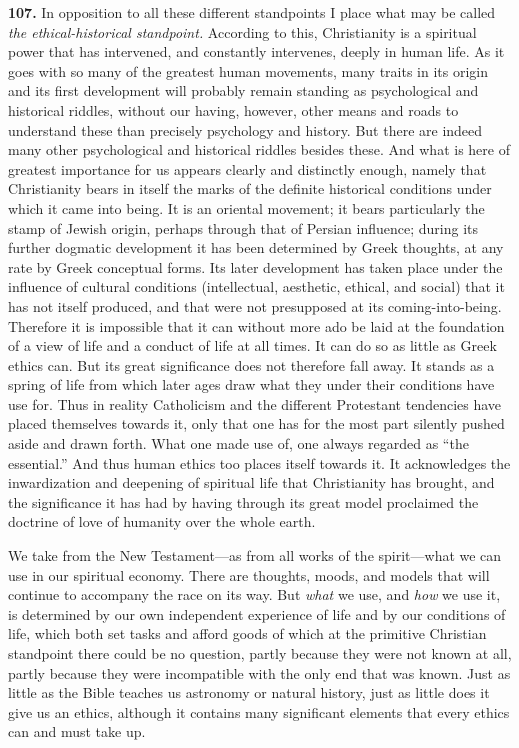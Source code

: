 \documentclass[12pt,a4paper]{book}
\newcommand{\opage}[1]{\marginnote{\footnotesize\textit{[#1]}}}
\begin{document}
\noindent\textbf{107.} In opposition to all these different standpoints I place what may be called \emph{the
ethical-historical standpoint.} According 
\opage{236}to this, Christianity is a spiritual power that has intervened, and constantly
intervenes, deeply in human life. As it goes with so many of the greatest human movements, many traits in its origin and
its first development will probably remain standing as psychological and historical riddles, without our having,
however, other means and roads to understand these than precisely psychology and history. But there are indeed many
other psychological and historical riddles besides these. And what is here of greatest importance for us appears clearly
and distinctly enough, namely that Christianity bears in itself the marks of the definite historical conditions under
which it came into being. It is an oriental movement; it bears particularly the stamp of Jewish origin, perhaps through
that of Persian influence; during its further dogmatic development it has been determined by Greek thoughts, at any rate
by Greek conceptual forms. Its later development has taken place under the influence of cultural conditions
(intellectual, aesthetic, ethical, and social) that it has not itself produced, and that were not presupposed at its
coming-into-being. Therefore it is impossible that it can without more ado be laid at the foundation of a view of life
and a conduct of life at all times. It can do so as little as Greek ethics can. But its great significance does not
therefore fall away. It stands as a spring of life from which later ages draw what they under their conditions have use
for. Thus in reality Catholicism and the different Protestant tendencies have placed themselves towards it, only that
one has for the most part silently pushed aside and drawn forth. What one made use of, one always regarded as ``the
essential.'' And thus human ethics too places itself towards it. It acknowledges the inwardization and deepening of
spiritual life that Christianity has brought, and the significance it has had by having through its great model
proclaimed the doctrine of love of humanity over the whole earth.

We take from the New Testament---as from all works of the spirit---what we can use in our spiritual economy. There are
thoughts, moods, and models that will continue to accompany the race on its way. But \emph{what} we use, and \emph{how}
we use it, is determined by our own independent experience of life and by our conditions of life, which both set tasks
and afford goods of which at the primitive Christian standpoint there could be no question, partly because they were not
known at all, partly because they were incompatible with the only end that was known. Just as little as the Bible
teaches us astronomy or natural history, just as little does 
\opage{237}it give us an ethics, although it contains many significant
elements that every ethics can and must take up.
\end{document}
